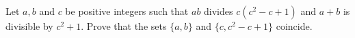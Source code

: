Let $a,b$ and $c$ be positive integers such that $ab$ divides $c(c^{2}-c+1)$ and $a+b$ is divisible by $c^{2}+1$.
Prove that the sets $\{a,b\}$ and $\{c,c^{2}-c+1\}$ coincide.
